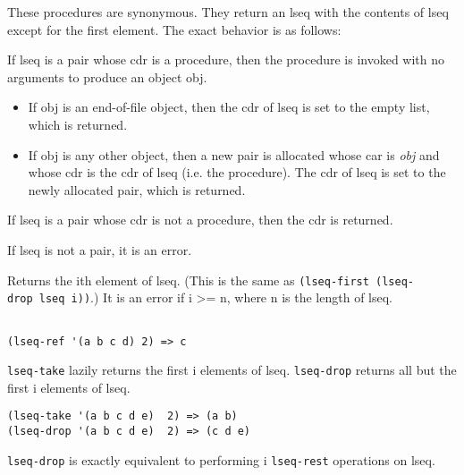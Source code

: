 \begin{entry}{%
  }

  These procedures are synonymous. They return an lseq with the
  contents of lseq except for the first element. The exact behavior is
  as follows:

  If lseq is a pair whose cdr is a procedure, then the procedure is
  invoked with no arguments to produce an object obj.

\begin{itemize}
  \tightlist
\item If obj is an end-of-file object, then the cdr of lseq is set to
  the empty list, which is returned.
\item If obj is any other object, then a new pair is allocated whose
  car is \emph{obj} and whose cdr is the cdr of lseq (i.e. the
  procedure). The cdr of lseq is set to the newly allocated pair,
  which is returned.
\end{itemize}

If lseq is a pair whose cdr is not a procedure, then the cdr is
returned.

If lseq is not a pair, it is an error.
\end{entry}

\begin{entry}{%
  }

  Returns the ith element of lseq. (This is the same as
  \texttt{(lseq-first\ (lseq-drop\ lseq\ i))}.) It is an error if i >=
  n, where n is the length of lseq.

\begin{verbatim}
    
(lseq-ref '(a b c d) 2) => c
\end{verbatim}
\end{entry}

\begin{entry}{%
  }

  \texttt{lseq-take} lazily returns the first i elements of lseq.
  \texttt{lseq-drop} returns all but the first i elements of lseq.

\begin{verbatim}
(lseq-take '(a b c d e)  2) => (a b)
(lseq-drop '(a b c d e)  2) => (c d e)
\end{verbatim}

  \texttt{lseq-drop} is exactly equivalent to performing i
  \texttt{lseq-rest} operations on lseq.
\end{entry}

